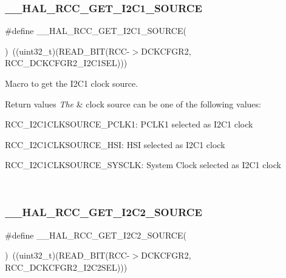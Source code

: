 \subsubsection{\texorpdfstring{\_\_HAL\_RCC\_GET\_I2C1\_SOURCE}{\_\_HAL\_RCC\_GET\_I2C1\_SOURCE}}
{\footnotesize\ttfamily \#define \+\_\+\+\_\+\+H\+A\+L\+\_\+\+R\+C\+C\+\_\+\+G\+E\+T\+\_\+\+I2\+C1\+\_\+\+S\+O\+U\+R\+CE(\begin{DoxyParamCaption}{ }\end{DoxyParamCaption})~((uint32\+\_\+t)(R\+E\+A\+D\+\_\+\+B\+IT(R\+CC-\/$>$D\+C\+K\+C\+F\+G\+R2, R\+C\+C\+\_\+\+D\+C\+K\+C\+F\+G\+R2\+\_\+\+I2\+C1\+S\+EL)))}



Macro to get the I2\+C1 clock source. 


\begin{DoxyRetVals}{Return values}
{\em The} & clock source can be one of the following values\+: \begin{DoxyItemize}
\item R\+C\+C\+\_\+\+I2\+C1\+C\+L\+K\+S\+O\+U\+R\+C\+E\+\_\+\+P\+C\+L\+K1\+: P\+C\+L\+K1 selected as I2\+C1 clock \item R\+C\+C\+\_\+\+I2\+C1\+C\+L\+K\+S\+O\+U\+R\+C\+E\+\_\+\+H\+SI\+: H\+SI selected as I2\+C1 clock \item R\+C\+C\+\_\+\+I2\+C1\+C\+L\+K\+S\+O\+U\+R\+C\+E\+\_\+\+S\+Y\+S\+C\+LK\+: System Clock selected as I2\+C1 clock \end{DoxyItemize}
\\
\hline
\end{DoxyRetVals}
\mbox{\label{group___r_c_c_ex___exported___macros_ga374d6807df83720c548fdea1d86d3852}} 
\subsubsection{\texorpdfstring{\_\_HAL\_RCC\_GET\_I2C2\_SOURCE}{\_\_HAL\_RCC\_GET\_I2C2\_SOURCE}}
{\footnotesize\ttfamily \#define \+\_\+\+\_\+\+H\+A\+L\+\_\+\+R\+C\+C\+\_\+\+G\+E\+T\+\_\+\+I2\+C2\+\_\+\+S\+O\+U\+R\+CE(\begin{DoxyParamCaption}{ }\end{DoxyParamCaption})~((uint32\+\_\+t)(R\+E\+A\+D\+\_\+\+B\+IT(R\+CC-\/$>$D\+C\+K\+C\+F\+G\+R2, R\+C\+C\+\_\+\+D\+C\+K\+C\+F\+G\+R2\+\_\+\+I2\+C2\+S\+EL)))}



